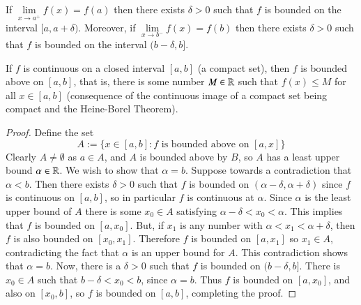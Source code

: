 \begin{cor}
    If $\lim\limits_{x\rightarrow a^+}f(x) = f(a)$ then there exists $\delta > 0$ such that $f$ is bounded on the interval $[a,a+\delta)$. Moreover, if $\lim\limits_{x\rightarrow b^-}f(x) = f(b)$ then there exists $\delta > 0$ such that $f$ is bounded on the interval $(b-\delta, b]$.
\end{cor}


\begin{thm}
    If $f$ is continuous on a closed interval $[a,b]$ (a compact set), then $f$ is bounded above on $[a,b]$, that is, there is some number $M \in \mathbb R$ such that $f(x) \leq M$ for all $x \in [a,b]$ (consequence of the continuous image of a compact set being compact and the Heine-Borel Theorem).
\end{thm}
\begin{proof}
    Define the set $$A:= \{x\in [a,b]:\text{$f$ is bounded above on $[a,x]$}\}$$
    Clearly $A \neq \emptyset$ as $a \in A$, and $A$ is bounded above by $B$, so $A$ has a least upper bound $\alpha \in \mathbb R$. We wish to show that $\alpha = b$. Suppose towards a contradiction that $\alpha < b$. Then there exists $\delta > 0$ such that $f$ is bounded on $(\alpha-\delta, \alpha + \delta)$ since $f$ is continuous on $[a,b]$, so in particular $f$ is continuous at $\alpha$. Since $\alpha$ is the least upper bound of $A$ there is some $x_0 \in A$ satisfying $\alpha - \delta < x_0 < \alpha$. This implies that $f$ is bounded on $[a,x_0]$. But, if $x_1$ is any number with $\alpha < x_1 < \alpha + \delta$, then $f$ is also bounded on $[x_0,x_1]$. Therefore $f$ is bounded on $[a,x_1]$ so $x_1 \in A$, contradicting the fact that $\alpha$ is an upper bound for $A$. This contradiction shows that $\alpha = b$. Now, there is a $\delta > 0$ such that $f$ is bounded on $(b-\delta, b]$. There is $x_0 \in A$ such that $b - \delta < x_0 < b$, since $\alpha = b$. Thus $f$ is bounded on $[a,x_0]$, and also on $[x_0,b]$, so $f$ is bounded on $[a,b]$, completing the proof.
\end{proof}




